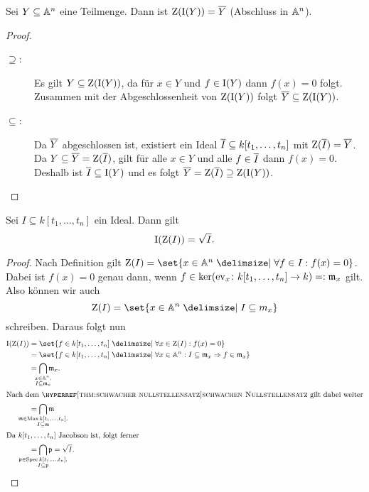 \documentclass[12pt,a4paper]{scrartcl}
\theoremstyle{cplain}
\theoremstyle{cdef}
\begin{document}
\begin{lem} \label{lem:8.12}
	Sei $Y\subseteq \mathbb A^n$ eine Teilmenge. Dann ist $\operatorname{Z}(\operatorname{I}(Y)) = \overline{Y}$ \textup(Abschluss in $\mathbb A^n$\textup).
\end{lem}
\begin{proof}
	\leavevmode
	\begin{description}
		\item[\glqq$\supseteq$\grqq:] Es gilt $Y\subseteq \operatorname{Z}(\operatorname{I}(Y))$, da für $x\in Y$ und $f\in \operatorname{I}(Y)$ dann $f(x) = 0$ folgt. Zusammen mit der Abgeschlossenheit von $\operatorname{Z}(\operatorname{I}(Y))$ folgt $\overline{Y}\subseteq \operatorname{Z}(\operatorname{I}(Y))$.
		\item[\glqq$\subseteq$\grqq:] Da $\overline{Y}$ abgeschlossen ist, existiert ein Ideal $\overline{I}\subseteq k[t_1,\dots, t_n]$ mit $\operatorname{Z}(\overline{I}) = \overline{Y}$. Da $Y\subseteq \overline{Y} = \operatorname{Z}(\overline{I})$, gilt für alle $x\in Y$ und alle $f\in\overline{I}$ dann $f(x) = 0$. Deshalb ist $\overline{I}\subseteq \operatorname{I}(Y)$ und es folgt $\overline{Y} = \operatorname{Z}(\overline{I}) \supseteq \operatorname{Z}(\operatorname{I}(Y))$.
		\qedhere
	\end{description}
\end{proof}
\begin{satz} \label{thm:hilberts nullstellensatz}
	Sei $I\subseteq k[t_1,\dots, t_n]$ ein Ideal. Dann gilt \[\operatorname{I}(\operatorname{Z}(I)) = \sqrt{I}.\]
\end{satz}

\begin{proof}
	Nach Definition gilt $\Z(I) = \set{x\in\IA^n\given \forall f\in I: f(x) = 0}$. Dabei ist $f(x) = 0$ genau dann, wenn $f\in \operatorname{ker}(\operatorname{ev}_x\colon k[t_1,\dots, t_n]\to k) =: \mathfrak{m}_x$ gilt. Also können wir auch \[\Z(I) = \set{x\in\IA^n\given I\subseteq m_x}\] schreiben. Daraus folgt nun
	\begin{align*}
		\I(\Z(I)) &= \set{f\in k[t_1,\dots, t_n]\given \forall x \in \Z(I): f(x) = 0} \\
		&= \set{f\in k[t_1,\dots, t_n] \given \forall x\in\IA^n: I\subseteq \fm_x\Rightarrow f\in \fm_x}\\
		&= \bigcap_{\mathclap{\substack{x\in\IA^n,\\I\subseteq \fm_x}}}\fm_x. \\
	\intertext{Nach dem \hyperreff[thm:schwacher nullstellensatz]{schwachen Nullstellensatz} gilt dabei weiter}
		&= \bigcap_{\mathclap{\substack{\fm\in\Max k[t_1,\dots,t_n],\\I\subseteq \fm}}}\fm \\
	\intertext{Da $k[t_1,\dots, t_n]$ Jacobson ist, folgt ferner}
		&= \bigcap_{\mathclap{\substack{\fp\in\Spec k[t_1,\dots,t_n],\\I\subseteq \fp}}}\fp = \sqrt I.
	\end{align*}\qedhere %
\end{proof}
\end{document}
